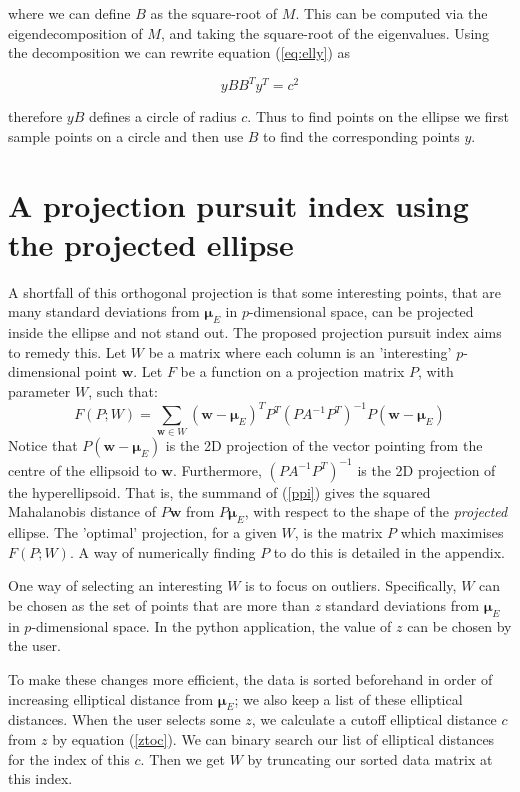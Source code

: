 \documentclass{article}
\renewcommand{\v}[1]{\boldsymbol{#1}}
\begin{document}
where we can define $B$ as the square-root of $M$. This can be computed via the eigendecomposition of $M$, and taking the square-root of the eigenvalues. Using the decomposition we can rewrite equation (\ref{eq:elly}) as

\begin{equation}
    y B B^T y^T = c^2
\end{equation}

therefore $y B$ defines a circle of radius $c$. Thus to find points on the ellipse we first sample points on a circle and then use $B$ to find the corresponding points $y$.




\section{A projection pursuit index using the projected ellipse}
A shortfall of this orthogonal projection is that some interesting points, that are many standard deviations from $\v{\mu}_E$ in $p$-dimensional space, can be projected inside the ellipse and not stand out. The proposed projection pursuit index aims to remedy this. Let $W$ be a matrix where each column is an 'interesting' $p$-dimensional point $\v{w}$. Let $F$ be a function on a projection matrix $P$, with parameter $W$, such that:
\begin{equation} \label{ppi}
    F(P; W) = \sum_{\v{w}\in W} (\v{w} - \v{\mu}_E)^T P^T (P A^{-1} P^T)^{-1} P(\v{w} - \v{\mu}_E)
\end{equation}
Notice that $P(\v{w} - \v{\mu}_E)$ is the 2D projection of the vector pointing from the centre of the ellipsoid to $\v{w}$. Furthermore, $(P A^{-1} P^T)^{-1}$ is the 2D projection of the hyperellipsoid. That is, the summand of (\ref{ppi}) gives the squared Mahalanobis distance of $P\v{w}$ from $P\v{\mu}_E$, with respect to the shape of the \emph{projected} ellipse. The 'optimal' projection, for a given $W$, is the matrix $P$ which maximises $F(P; W)$. A way of numerically finding $P$ to do this is detailed in the appendix.

One way of selecting an interesting $W$ is to focus on outliers. Specifically, $W$ can be chosen as the set of points that are more than $z$ standard deviations from $\v{\mu}_E$ in $p$-dimensional space. In the python application, the value of $z$ can be chosen by the user. 

To make these changes more efficient, the data is sorted beforehand in order of increasing elliptical distance from $\v{\mu}_E$; we also keep a list of these elliptical distances. When the user selects some $z$, we calculate a cutoff elliptical distance $c$ from $z$ by equation (\ref{ztoc}). We can binary search our list of elliptical distances for the index of this $c$. Then we get $W$ by truncating our sorted data matrix at this index.
\end{document}

